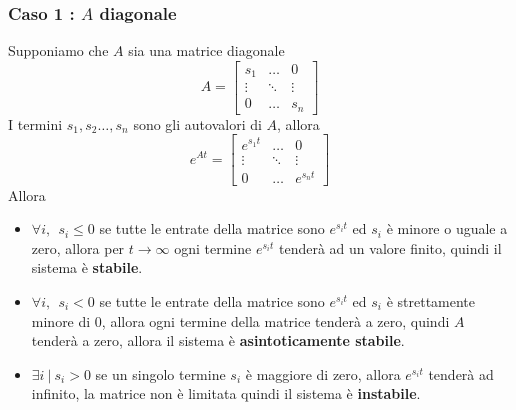 \documentclass[10pt, letterpaper]{report}
\begin{document}
\subsubsection{Caso 1 : $A$ diagonale}
Supponiamo che $A$ sia una matrice diagonale 
$$ A=\begin{bmatrix}
    s_1 &\dots &0\\ 
    \vdots & \ddots & \vdots \\ 
    0 & \dots & s_n 
\end{bmatrix}$$
I termini $s_1,s_2\dots,s_n$ sono gli autovalori di $A$, allora 
$$ e^{At}=\begin{bmatrix}
    e^{s_1t} &\dots &0\\ 
    \vdots & \ddots & \vdots \\ 
    0 & \dots &  e^{s_nt}
\end{bmatrix}$$
Allora \begin{itemize}
    \item $\forall i, \ \ s_i\le 0$ se tutte le entrate della matrice sono $e^{s_it}$ ed $s_i$ è minore o uguale a 
    zero, allora per $t\rightarrow \infty$ ogni termine $e^{s_it}$ tenderà ad un valore finito, quindi il 
    sistema è \textbf{stabile}. 
    \item $\forall i, \ \ s_i< 0$ se tutte le entrate della matrice sono $e^{s_it}$ ed $s_i$ è strettamente 
    minore di 0, allora ogni termine della matrice tenderà a zero, quindi $A$ tenderà a zero, allora il sistema 
    è \textbf{asintoticamente stabile}. 
    \item $\exists i \ | \ s_i>0$ se un singolo termine $s_i$ è maggiore di zero, allora $e^{s_it}$ tenderà ad infinito, 
    la matrice non è limitata quindi il sistema è \textbf{instabile}.
\end{itemize}
\end{document}
